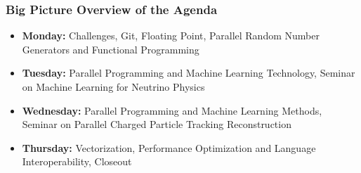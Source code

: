 \begin{frame}
\frametitle{Big Picture Overview of the Agenda}

\begin{itemize}
\item {\bf Monday:} Challenges, Git, Floating Point, Parallel Random Number Generators and Functional Programming
\item {\bf Tuesday:} Parallel Programming and Machine Learning Technology, Seminar on Machine Learning for Neutrino Physics
\item {\bf Wednesday:} Parallel Programming and Machine Learning Methods, Seminar on Parallel Charged Particle Tracking Reconstruction
\item {\bf Thursday:} Vectorization, Performance Optimization and Language Interoperability, Closeout
\end{itemize}

\end{frame}


